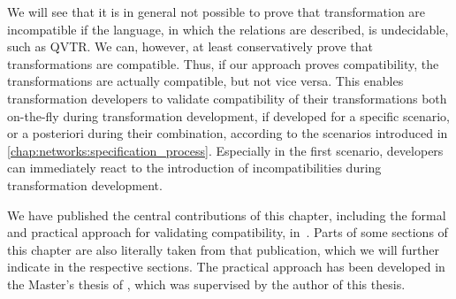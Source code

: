 
We will see that it is in general not possible to prove that transformation are incompatible if the language, in which the relations are described, is undecidable, such as \gls{QVTR}.
We can, however, at least conservatively prove that transformations are compatible.
Thus, if our approach proves compatibility, the transformations are actually compatible, but not vice versa.
This enables transformation developers to validate compatibility of their transformations both on-the-fly during transformation development, if developed for a specific scenario, or a posteriori during their combination, according to the scenarios introduced in \autoref{chap:networks:specification_process}.
Especially in the first scenario, developers can immediately react to the introduction of incompatibilities during transformation development.

We have published the central contributions of this chapter, including the formal and practical approach for validating compatibility, in~.
Parts of some sections of this chapter are also literally taken from that publication, which we will further indicate in the respective sections.
The practical approach has been developed in the Master's thesis of \textcite{pepin2019ma}, which was supervised by the author of this thesis.





